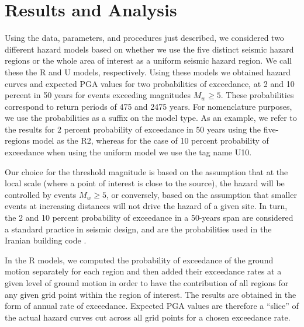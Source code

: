 

\section{Results and Analysis}

Using the data, parameters, and procedures just described, we considered two different hazard models based on whether we use the five distinct seismic hazard regions or the whole area of interest as a uniform seismic hazard region. We call these the R and U models, respectively. Using these models we obtained hazard curves and expected PGA values for two probabilities of exceedance, at 2 and 10 percent in 50 years for events exceeding magnitudes $M_w \geq 5$. These probabilities correspond to return periods of 475 and 2475 years. For nomenclature purposes, we use the probabilities as a suffix on the model type. As an example, we refer to the results for 2 percent probability of exceedance in 50 years using the five-regions model as the R2, whereas for the case of 10 percent probability of exceedance when using the uniform model we use the tag name U10.

Our choice for the threshold magnitude is based on the assumption that at the local scale (where a point of interest is close to the source), the hazard will be controlled by events $M_w \geq 5$, or conversely, based on the assumption that smaller events at increasing distances will not drive the hazard of a given site. In turn, the 2 and 10 percent probability of exceedance in a 50-years span are considered a standard practice in seismic design, and are the probabilities used in the Iranian building code \citep{BHRC2014}.

In the R models, we computed the probability of exceedance of the ground motion separately for each region and then added their exceedance rates at a given level of ground motion in order to have the contribution of all regions for any given grid point within the region of interest. The results are obtained in the form of annual rate of exceedance. Expected PGA values are therefore a ``slice'' of the actual hazard curves cut across all grid points for a chosen exceedance rate.

